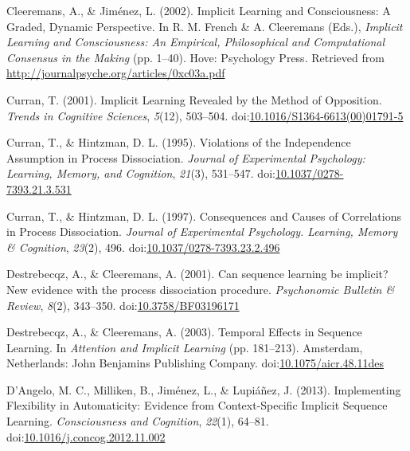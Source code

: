 \documentclass[floatsintext,man]{apa6}
\begin{document}
\hypertarget{ref-cleeremansux5fimplicitux5f2002}{}
Cleeremans, A., \& Jiménez, L. (2002). Implicit Learning and
Consciousness: A Graded, Dynamic Perspective. In R. M. French \& A.
Cleeremans (Eds.), \emph{Implicit Learning and Consciousness: An
Empirical, Philosophical and Computational Consensus in the Making} (pp.
1--40). Hove: Psychology Press. Retrieved from
\url{http://journalpsyche.org/articles/0xc03a.pdf}

\hypertarget{ref-curranux5fimplicitux5f2001}{}
Curran, T. (2001). Implicit Learning Revealed by the Method of
Opposition. \emph{Trends in Cognitive Sciences}, \emph{5}(12), 503--504.
doi:\href{https://doi.org/10.1016/S1364-6613(00)01791-5}{10.1016/S1364-6613(00)01791-5}

\hypertarget{ref-curranux5fviolationsux5f1995}{}
Curran, T., \& Hintzman, D. L. (1995). Violations of the Independence
Assumption in Process Dissociation. \emph{Journal of Experimental
Psychology: Learning, Memory, and Cognition}, \emph{21}(3), 531--547.
doi:\href{https://doi.org/10.1037/0278-7393.21.3.531}{10.1037/0278-7393.21.3.531}

\hypertarget{ref-curranux5fconsequencesux5f1997}{}
Curran, T., \& Hintzman, D. L. (1997). Consequences and Causes of
Correlations in Process Dissociation. \emph{Journal of Experimental
Psychology. Learning, Memory \& Cognition}, \emph{23}(2), 496.
doi:\href{https://doi.org/10.1037/0278-7393.23.2.496}{10.1037/0278-7393.23.2.496}

\hypertarget{ref-destrebecqzux5fcanux5f2001}{}
Destrebecqz, A., \& Cleeremans, A. (2001). Can sequence learning be
implicit? New evidence with the process dissociation procedure.
\emph{Psychonomic Bulletin \& Review}, \emph{8}(2), 343--350.
doi:\href{https://doi.org/10.3758/BF03196171}{10.3758/BF03196171}

\hypertarget{ref-destrebecqzux5ftemporalux5f2003ux5fdoi}{}
Destrebecqz, A., \& Cleeremans, A. (2003). Temporal Effects in Sequence
Learning. In \emph{Attention and Implicit Learning} (pp. 181--213).
Amsterdam, Netherlands: John Benjamins Publishing Company.
doi:\href{https://doi.org/10.1075/aicr.48.11des}{10.1075/aicr.48.11des}

\hypertarget{ref-dangeloux5fimplementingux5f2013}{}
D'Angelo, M. C., Milliken, B., Jiménez, L., \& Lupiáñez, J. (2013).
Implementing Flexibility in Automaticity: Evidence from Context-Specific
Implicit Sequence Learning. \emph{Consciousness and Cognition},
\emph{22}(1), 64--81.
doi:\href{https://doi.org/10.1016/j.concog.2012.11.002}{10.1016/j.concog.2012.11.002}
\end{document}
